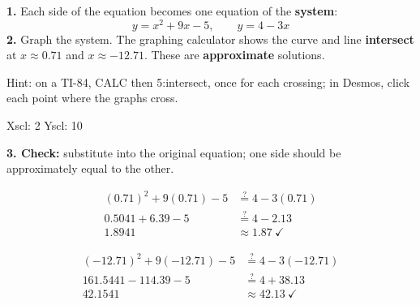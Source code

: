 \begin{minipage}[t]{0.55\textwidth}
\vspace{0pt}\raggedright
\textbf{1.} Each side of the equation becomes one equation of the \textbf{system}:
\[y=x^2+9x-5,\qquad y=4-3x\]
\textbf{2.} Graph the system. The graphing calculator shows the curve and line \textbf{intersect} at $x\approx0.71$ and $x\approx-12.71$. These are \textbf{approximate} solutions.

Hint: on a TI-84, CALC then 5:intersect, once for each crossing; in Desmos, click each point where the graphs cross.

\end{minipage}\hfill
\begin{minipage}[t]{0.42\textwidth}
\vspace{0pt}
\begin{center}

{\scriptsize Xscl: 2 \quad Yscl: 10}
\end{center}
\end{minipage}

\textbf{3. Check:} substitute into the original equation; one side should be approximately equal to the other.

\begin{minipage}[t]{0.48\textwidth}
\[
\begin{aligned}
(0.71)^2+9(0.71)-5&\stackrel{?}{=}4-3(0.71)\\
0.5041+6.39-5&\stackrel{?}{=}4-2.13\\
1.8941&\approx1.87\ \checkmark
\end{aligned}
\]
\end{minipage}\hfill
\begin{minipage}[t]{0.50\textwidth}
\[
\begin{aligned}
(-12.71)^2+9(-12.71)-5&\stackrel{?}{=}4-3(-12.71)\\
161.5441-114.39-5&\stackrel{?}{=}4+38.13\\
42.1541&\approx42.13\ \checkmark
\end{aligned}
\]
\end{minipage}

